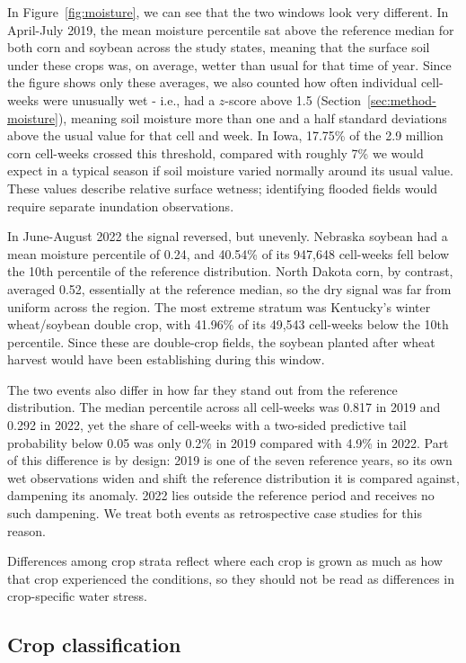 \documentclass[10pt,letterpaper]{article}
\begin{document}
In Figure~\ref{fig:moisture}, we can see that the two windows look very different. In April-July 2019, the mean moisture percentile sat above the reference median for both corn and soybean across the study states, meaning that the surface soil under these crops was, on average, wetter than usual for that time of year. Since the figure shows only these averages, we also counted how often individual cell-weeks were unusually wet - i.e., had a $z$-score above 1.5 (Section~\ref{sec:method-moisture}), meaning soil moisture more than one and a half standard deviations above the usual value for that cell and week. In Iowa, 17.75\% of the 2.9 million corn cell-weeks crossed this threshold, compared with roughly 7\% we would expect in a typical season if soil moisture varied normally around its usual value. These values describe relative surface wetness; identifying flooded fields would require separate inundation observations.

In June-August 2022 the signal reversed, but unevenly. Nebraska soybean had a mean moisture percentile of 0.24, and 40.54\% of its 947,648 cell-weeks fell below the 10th percentile of the reference distribution. North Dakota corn, by contrast, averaged 0.52, essentially at the reference median, so the dry signal was far from uniform across the region. The most extreme stratum was Kentucky's winter wheat/soybean double crop, with 41.96\% of its 49,543 cell-weeks below the 10th percentile. Since these are double-crop fields, the soybean planted after wheat harvest would have been establishing during this window.

The two events also differ in how far they stand out from the reference distribution. The median percentile across all cell-weeks was 0.817 in 2019 and 0.292 in 2022, yet the share of cell-weeks with a two-sided predictive tail probability below 0.05 was only 0.2\% in 2019 compared with 4.9\% in 2022. Part of this difference is by design: 2019 is one of the seven reference years, so its own wet observations widen and shift the reference distribution it is compared against, dampening its anomaly. 2022 lies outside the reference period and receives no such dampening. We treat both events as retrospective case studies for this reason.

Differences among crop strata reflect where each crop is grown as much as how that crop experienced the conditions, so they should not be read as differences in crop-specific water stress.

\FloatBarrier\subsection{Crop classification}\label{sec:result-classifier}
\end{document}
